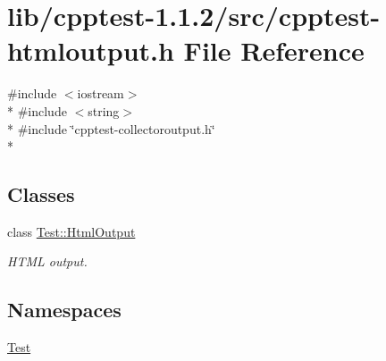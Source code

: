 \hypertarget{cpptest-htmloutput_8h}{}\section{lib/cpptest-\/1.1.2/src/cpptest-\/htmloutput.h File Reference}
\label{cpptest-htmloutput_8h}
{\ttfamily \#include $<$iostream$>$}\\*
{\ttfamily \#include $<$string$>$}\\*
{\ttfamily \#include \char`\"{}cpptest-\/collectoroutput.\+h\char`\"{}}\\*
\subsection*{Classes}
\begin{DoxyCompactItemize}
\item 
class \hyperlink{class_test_1_1_html_output}{Test\+::\+Html\+Output}
\begin{DoxyCompactList}\small\item\em H\+T\+ML output. \end{DoxyCompactList}\end{DoxyCompactItemize}
\subsection*{Namespaces}
\begin{DoxyCompactItemize}
\item 
 \hyperlink{namespace_test}{Test}
\end{DoxyCompactItemize}
